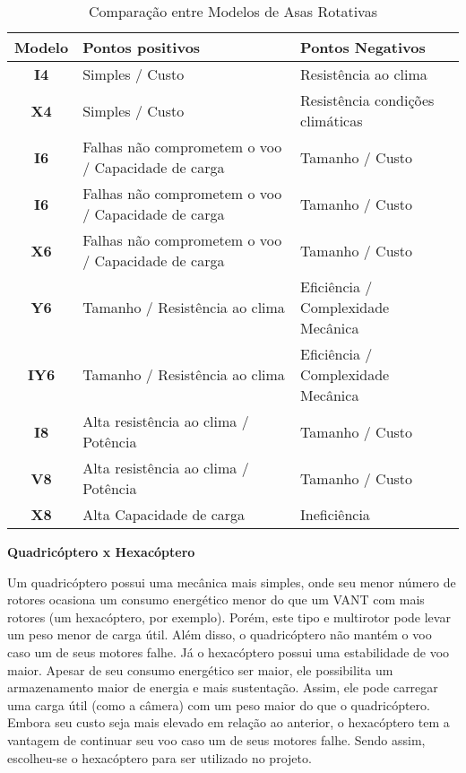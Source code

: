 \begin{table}[H]
\centering
\begin{tabular}{c|p{6cm}|p{5cm}}
\toprule
\textbf{Modelo} & \textbf{Pontos positivos} & \textbf{Pontos Negativos} \\
\midrule
\textbf{I4} & Simples / Custo & Resistência ao clima \\ \hline
\textbf{X4} & Simples / Custo & Resistência condições climáticas \\ \hline
\textbf{I6} & Falhas não comprometem o voo / Capacidade de carga & Tamanho / Custo \\ \hline
\textbf{I6} & Falhas não comprometem o voo / Capacidade de carga & Tamanho / Custo \\ \hline
\textbf{X6} & Falhas não comprometem o voo / Capacidade de carga & Tamanho / Custo \\ \hline
\textbf{Y6} & Tamanho / Resistência ao clima & Eficiência / Complexidade Mecânica \\ \hline
\textbf{IY6}& Tamanho / Resistência ao clima & Eficiência / Complexidade Mecânica \\ \hline
\textbf{I8} & Alta resistência ao clima / Potência & Tamanho / Custo \\ \hline
\textbf{V8} & Alta resistência ao clima / Potência & Tamanho / Custo \\ \hline
\textbf{X8} & Alta Capacidade de carga & Ineficiência \\
\bottomrule
\end{tabular}
\caption{Comparação entre Modelos de Asas Rotativas}
\end{table}

\textbf{Quadricóptero x Hexacóptero}

Um quadricóptero possui uma mecânica mais simples, onde seu menor número de rotores ocasiona um consumo energético menor do que um VANT com mais rotores (um hexacóptero, por exemplo). Porém, este tipo e multirotor pode levar um peso menor de carga útil. Além disso, o quadricóptero não mantém o voo caso um de seus motores falhe.
Já o hexacóptero possui uma estabilidade de voo maior. Apesar de seu consumo energético ser maior, ele possibilita um armazenamento maior de energia e mais sustentação. Assim, ele pode carregar uma carga útil (como a câmera) com um peso maior do que o quadricóptero. Embora seu custo seja mais elevado em relação ao anterior, o hexacóptero tem a vantagem de continuar seu voo caso um de seus motores falhe. Sendo assim, escolheu-se o hexacóptero para ser utilizado no projeto.

